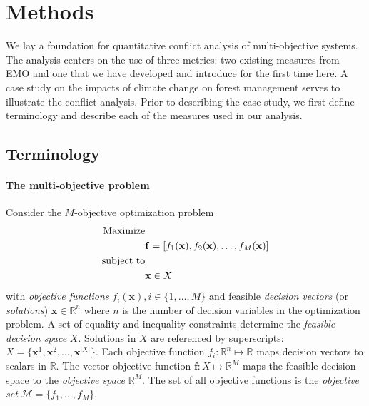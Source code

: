 \section{Methods}
\label{sec:methods}
We lay a foundation for quantitative conflict analysis of multi-objective systems. The analysis centers on the use of three metrics: two existing measures from EMO and one that we have developed and introduce for the first time here. A case study on the impacts of climate change on forest management serves to illustrate the conflict analysis. Prior to describing the case study, we first define terminology and describe each of the measures used in our analysis.

\subsection{Terminology}
\label{subsec:terminology}
  
\paragraph{The multi-objective problem}
Consider the $M$-objective optimization problem
\begin{align}
\text{Maximize}& \notag \\
& \mathbf{f} = [f_1(\mathbf{x}), f_2(\mathbf{x}), \ldots, f_M(\mathbf{x}) ] \label{eqn:generalObj}\\
\text{subject to}& \notag \\
& \mathbf{x} \in X \label{eqn:generalConstraint}
\end{align}
with \textit{objective functions} $f_i(\mathbf{x}), i \in \{1,\ldots,M\}$ and feasible \textit{decision vectors} (or \textit{solutions}) $\mathbf{x} \in \mathbb{R}^n$ where $n$ is the number of decision variables in the optimization problem. A set of equality and inequality constraints determine the \textit{feasible decision space} $X$. Solutions in $X$ are referenced by superscripts: $X = \{\mathbf{x}^1,\mathbf{x}^2,\ldots,\mathbf{x}^{|X|}\}$. Each objective function $f_i : \mathbb{R}^n \mapsto \mathbb{R}$ maps decision vectors to scalars in $\mathbb{R}$. The vector objective function $\mathbf{f} : X \mapsto \mathbb{R}^M$ maps the feasible decision space to the \textit{objective space} $\mathbb{R}^M$. The set of all objective functions is the \textit{objective set} $\mathcal{M} = \{f_1,\ldots,f_M\}$.


